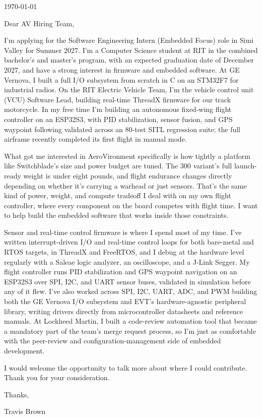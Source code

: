 \documentclass[11pt]{article}
\begin{document}
\begin{flushright}
  \today
\end{flushright}

Dear AV Hiring Team,

I'm applying for the Software Engineering Intern (Embedded Focus) role in
Simi Valley for Summer 2027. I'm a Computer Science student at RIT in the
combined bachelor's and master's program, with an expected graduation date
of December 2027, and have a strong interest in firmware and embedded
software. At GE Vernova, I built a full I/O subsystem from scratch in C on
an STM32F7 for industrial radios. On the RIT Electric Vehicle Team, I'm the
vehicle control unit (VCU) Software Lead, building real-time ThreadX
firmware for our track motorcycle. In my free time I'm building an
autonomous fixed-wing flight controller on an ESP32S3, with PID
stabilization, sensor fusion, and GPS waypoint following validated across
an 80-test SITL regression suite; the full airframe recently completed its
first flight in manual mode.

What got me interested in AeroVironment specifically is how tightly a
platform like Switchblade's size and power budget are tuned. The 300
variant's full launch-ready weight is under eight pounds, and flight
endurance changes directly depending on whether it's carrying a warhead or
just sensors. That's the same kind of power, weight, and compute tradeoff I
deal with on my own flight controller, where every component on the board
competes with flight time. I want to help build the embedded software that
works inside those constraints.

Sensor and real-time control firmware is where I spend most of my time.
I've written interrupt-driven I/O and real-time control loops for both
bare-metal and RTOS targets, in ThreadX and FreeRTOS, and I debug at the
hardware level regularly with a Saleae logic analyzer, an oscilloscope, and
a J-Link Segger. My flight controller runs PID stabilization and GPS
waypoint navigation on an ESP32S3 over SPI, I2C, and UART sensor buses,
validated in simulation before any of it flew. I've also worked across SPI,
I2C, UART, ADC, and PWM building both the GE Vernova I/O subsystem and
EVT's hardware-agnostic peripheral library, writing drivers directly from
microcontroller datasheets and reference manuals. At Lockheed Martin, I
built a code-review automation tool that became a mandatory part of the
team's merge request process, so I'm just as comfortable with the
peer-review and configuration-management side of embedded development.

I would welcome the opportunity to talk more about where I could
contribute. Thank you for your consideration.

Thanks,

Travis Brown
\end{document}
